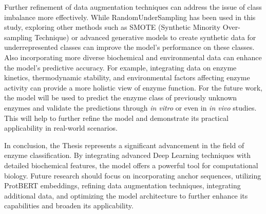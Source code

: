 Further refinement of data augmentation techniques can address the issue of class imbalance more effectively. While RandomUnderSampling has been used in this study, exploring other methods such as SMOTE (Synthetic Minority Over-sampling Technique) or advanced generative models to create synthetic data for underrepresented classes can improve the model's performance on these classes. Also incorporating more diverse biochemical and environmental data can enhance the model's predictive accuracy. For example, integrating data on enzyme kinetics, thermodynamic stability, and environmental factors affecting enzyme activity can provide a more holistic view of enzyme function. For the future work, the model will be used to predict the enzyme class of previously unknown enzymes and validate the predictions through \textit{in vitro} or even in \textit{in vivo} studies. This will help to further refine the model and demonstrate its practical applicability in real-world scenarios.

In conclusion, the Thesis represents a significant advancement in the field of enzyme classification. By integrating advanced Deep Learning techniques with detailed biochemical features, the model offers a powerful tool for computational biology. Future research should focus on incorporating anchor sequences, utilizing ProtBERT embeddings, refining data augmentation techniques, integrating additional data, and optimizing the model architecture to further enhance its capabilities and broaden its applicability.